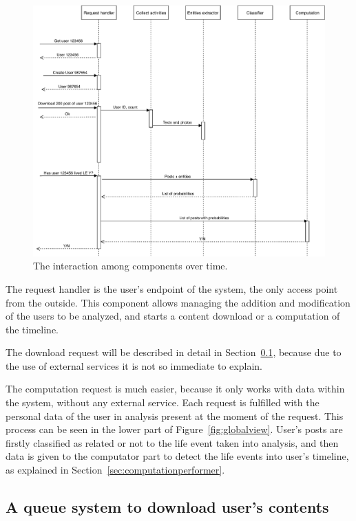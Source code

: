 \begin{figure}
\centering
\includegraphics[width=%
1\textwidth]{img/Interaction}
\caption{The interaction among components over time.}
\label{fig:interaction}
\end{figure}

The request handler is the user's endpoint of the system, the only access point from the outside. This component allows managing the addition and modification of the users to be analyzed, and starts a content download or a computation of the timeline.

The download request will be described in detail in Section~\ref{sec:downloadqueues}, because due to the use of external services it is not so immediate to explain.

The computation request is much easier, because it only works with data within the system, without any external service. Each request is fulfilled with the personal data of the user in analysis present at the moment of the request. This process can be seen in the lower part of Figure~\ref{fig:globalview}. User's posts are firstly classified as related or not to the life event taken into analysis, and then data is given to the computator part to detect the life events into user's timeline, as explained in Section~\ref{sec:computationperformer}. 

\subsection{A queue system to download user's contents}
\label{sec:downloadqueues}

